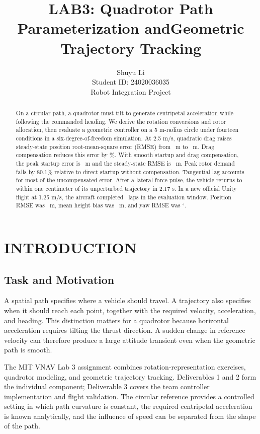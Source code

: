 \documentclass[letterpaper,10pt,conference]{ieeeconf}
\title{\LARGE\bf LAB3: Quadrotor Path Parameterization and\newline Geometric Trajectory Tracking}
\author{Shuyu Li\\Student ID: 24020036035\\Robot Integration Project}
\begin{document}
\maketitle
\thispagestyle{plain}\pagestyle{plain}
\begin{abstract}
On a circular path, a quadrotor must tilt to generate centripetal acceleration while following the commanded heading. We derive the rotation conversions and rotor allocation, then evaluate a geometric controller on a 5 m-radius circle under fourteen conditions in a six-degree-of-freedom simulation. At 2.5 m/s, quadratic drag raises steady-state position root-mean-square error (RMSE) from \NomRMSE\ m to \DragRMSE\ m. Drag compensation reduces this error by \CompGain\%. With smooth startup and drag compensation, the peak startup error is \JointStart\ m and the steady-state RMSE is \JointSteady\ m. Peak rotor demand falls by 80.1\% relative to direct startup without compensation. Tangential lag accounts for most of the uncompensated error. After a lateral force pulse, the vehicle returns to within one centimeter of its unperturbed trajectory in 2.17 s. In a new official Unity flight at 1.25 m/s, the aircraft completed \FlightLaps\ laps in the evaluation window. Position RMSE was \FlightPos\ m, mean height bias was \FlightBias\ m, and yaw RMSE was \FlightYaw$^\circ$.
\end{abstract}

\section{INTRODUCTION}
\subsection{Task and Motivation}
A spatial path specifies where a vehicle should travel. A trajectory also specifies when it should reach each point, together with the required velocity, acceleration, and heading. This distinction matters for a quadrotor because horizontal acceleration requires tilting the thrust direction. A sudden change in reference velocity can therefore produce a large attitude transient even when the geometric path is smooth.

The MIT VNAV Lab 3 assignment combines rotation-representation exercises, quadrotor modeling, and geometric trajectory tracking\cite{lab}. Deliverables 1 and 2 form the individual component; Deliverable 3 covers the team controller implementation and flight validation. The circular reference provides a controlled setting in which path curvature is constant, the required centripetal acceleration is known analytically, and the influence of speed can be separated from the shape of the path.
\end{document}
